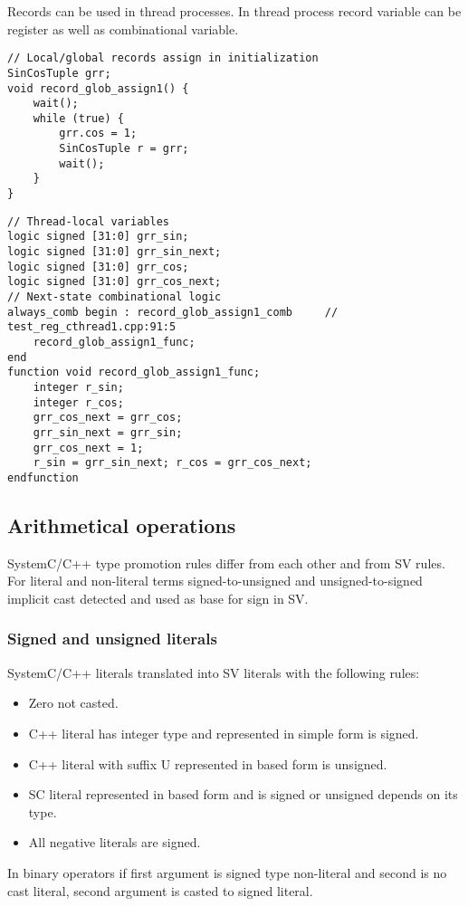 Records can be used in thread processes. In thread process record variable can be register as well as combinational variable. 

\begin{lstlisting}[style=mycpp]
// Local/global records assign in initialization
SinCosTuple grr;
void record_glob_assign1() {
    wait();
    while (true) {
        grr.cos = 1;
        SinCosTuple r = grr;
        wait();
    }
}
\end{lstlisting}
%
\begin{lstlisting}[style=myverilog]
// Thread-local variables
logic signed [31:0] grr_sin;
logic signed [31:0] grr_sin_next;
logic signed [31:0] grr_cos;
logic signed [31:0] grr_cos_next;
// Next-state combinational logic
always_comb begin : record_glob_assign1_comb     // test_reg_cthread1.cpp:91:5
    record_glob_assign1_func;
end
function void record_glob_assign1_func;
    integer r_sin;
    integer r_cos;
    grr_cos_next = grr_cos;
    grr_sin_next = grr_sin;
    grr_cos_next = 1;
    r_sin = grr_sin_next; r_cos = grr_cos_next;
endfunction
\end{lstlisting}




\subsection{Arithmetical operations}\label{section:arithmetic_gen}

SystemC/C++ type promotion rules differ from each other and from SV rules. For literal and non-literal terms signed-to-unsigned and unsigned-to-signed implicit cast detected and used as base for sign in SV.

\subsubsection{Signed and unsigned literals}

SystemC/C++ literals translated into SV literals with the following rules:
\begin{itemize}
\item Zero not casted.
\item C++ literal has integer type and represented in simple form is signed.
\item C++ literal with suffix U represented in based form is unsigned.
\item SC literal represented in based form and is signed or unsigned depends on its type.
\item All negative literals are signed.
\end{itemize}
In binary operators if first argument is signed type non-literal and second is no cast literal, second argument is casted to signed literal.


